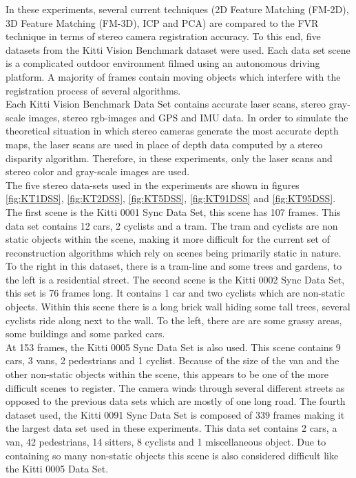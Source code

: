 	
In these experiments, several current techniques (2D Feature Matching (FM-2D), 3D Feature Matching (FM-3D), ICP and PCA) are compared to the FVR technique in terms of stereo camera registration accuracy. To this end, five datasets from the Kitti Vision Benchmark dataset \cite{Geiger13Vision} were used. Each data set scene is a complicated outdoor environment filmed using an autonomous driving platform. A majority of frames contain moving objects which interfere with the registration process of several algorithms. \\

Each Kitti Vision Benchmark Data Set contains accurate laser scans, stereo gray-scale images, stereo rgb-images and GPS and IMU data. In order to simulate the theoretical situation in which stereo cameras generate the most accurate depth maps, the laser scans are used in place of depth data computed by a stereo disparity algorithm. Therefore, in these experiments, only the laser scans and stereo color and gray-scale images are used. \\




The five stereo data-sets used in the experiments are shown in figures \ref{fig:KT1DSS}, \ref{fig:KT2DSS}, \ref{fig:KT5DSS}, \ref{fig:KT91DSS} and \ref{fig:KT95DSS}. The first scene is the Kitti 0001 Sync Data Set, this scene has 107 frames. This data set contains 12 cars, 2 cyclists and a tram. The tram and cyclists are non static objects within the scene, making it more difficult for the current set of reconstruction algorithms which rely on scenes being primarily static in nature. To the right in this dataset, there is a tram-line and some trees and gardens, to the left is a residential street. The second scene is the Kitti 0002 Sync Data Set, this set is 76 frames long. It contains 1 car and two cyclists which are non-static objects. Within this scene there is a long brick wall hiding some tall trees, several cyclists ride along next to the wall. To the left, there are are some grassy areas, some buildings and some parked cars. \\

At 153 frames, the Kitti 0005 Sync Data Set is also used. This scene contains 9 cars, 3 vans, 2 pedestrians and 1 cyclist. Because of the size of the van and the other non-static objects within the scene, this appears to be one of the more difficult scenes to register. The camera winds through several different streets as opposed to the previous data sets which are mostly of one long road. The fourth dataset used, the Kitti 0091 Sync Data Set is composed of 339 frames making it the largest data set used in these experiments. This data set contains 2 cars, a van, 42 pedestrians, 14 sitters, 8 cyclists and 1 miscellaneous object. Due to containing so many non-static objects this scene is also considered difficult like the Kitti 0005 Data Set. \\

